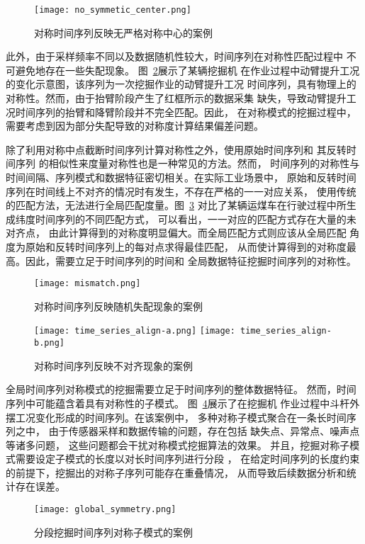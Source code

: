 \begin{figure}
  \centering
  \texttt{[image: no\_symmetic\_center.png]}
  \caption{对称时间序列反映无严格对称中心的案例}
  \label{fig:no_symmetic_center}
\end{figure}

此外，由于采样频率不同以及数据随机性较大，时间序列在对称性匹配过程中
不可避免地存在一些失配现象\cite{DBLP:journals/corr/abs-2202-05403}。
图~\ref{fig:mismatch}展示了某辆挖掘机
在作业过程中动臂提升工况的变化示意图，该序列为一次挖掘作业的动臂提升工况
时间序列，具有物理上的对称性。然而，由于抬臂阶段产生了红框所示的数据采集
缺失，导致动臂提升工况时间序列的抬臂和降臂阶段并不完全匹配。因此，
在对称模式的挖掘过程中，需要考虑到因为部分失配导致的对称度计算结果偏差问题。

除了利用对称中点截断时间序列计算对称性之外，使用原始时间序列和
其反转时间序列\cite{DBLP:journals/entropy/ChvostekovaJK21}
的相似性来度量对称性也是一种常见的方法。然而，
时间序列的对称性与时间间隔、序列模式和数据特征密切相关。在实际工业场景中，
原始和反转时间序列在时间线上不对齐的情况时有发生，不存在严格的一一对应关系，
使用传统的匹配方法，无法进行全局匹配度量。图~\ref{fig:time_series_align}
对比了某辆运煤车在行驶过程中所生成纬度时间序列的不同匹配方式，
可以看出，一一对应的匹配方式存在大量的未对齐点，
由此计算得到的对称度明显偏大。而全局匹配方式则应该从全局匹配
角度为原始和反转时间序列上的每对点求得最佳匹配，
从而使计算得到的对称度最高。因此，需要立足于时间序列的时间和
全局数据特征挖掘时间序列的对称性。
\begin{figure}
  \centering
  \texttt{[image: mismatch.png]}
  \caption{对称时间序列反映随机失配现象的案例}
  \label{fig:mismatch}
\end{figure}
\begin{figure}
  \centering
    {\texttt{[image: time\_series\_align-a.png]}}
    {\texttt{[image: time\_series\_align-b.png]}}
  \caption{对称时间序列反映不对齐现象的案例}
  \label{fig:time_series_align}
\end{figure}

全局时间序列对称模式的挖掘需要立足于时间序列的整体数据特征。
然而，时间序列中可能蕴含着具有对称性的子模式。
图~\ref{fig:segement_symmetric_pattern}展示了在挖掘机
作业过程中斗杆外摆工况变化形成的时间序列。在该案例中，
多种对称子模式聚合在一条长时间序列之中，
由于传感器采样和数据传输的问题，存在包括
缺失点、异常点、噪声点等诸多问题\cite{DBLP:conf/sigmod/SongZWY15}，
这些问题都会干扰对称模式挖掘算法的效果。
并且，挖掘对称子模式需要设定子模式的长度以对长时间序列进行分段
\cite{DBLP:journals/tist/MuralidharTCCRP20}，
在给定时间序列的长度约束的前提下，挖掘出的对称子序列可能存在重叠情况，
从而导致后续数据分析和统计存在误差。
\begin{figure}
  \centering
  \texttt{[image: global\_symmetry.png]}
  \caption{分段挖掘时间序列对称子模式的案例}
  \label{fig:segement_symmetric_pattern}
\end{figure}

